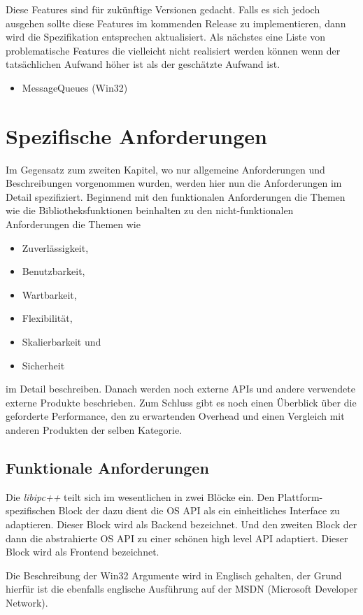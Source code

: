 \documentclass[a4paper]{book}
\begin{document}
Diese Features sind für zukünftige Versionen gedacht. Falls es sich jedoch ausgehen sollte diese Features im kommenden Release zu implementieren, dann wird die Spezifikation entsprechen aktualisiert. Als nächstes eine Liste von problematische Features die vielleicht nicht realisiert werden können wenn der tatsächlichen Aufwand höher ist als der geschätzte Aufwand ist.
\begin{itemize}
\item MessageQueues (Win32)
\end{itemize}

\chapter{Spezifische Anforderungen}
Im Gegensatz zum zweiten Kapitel, wo nur allgemeine Anforderungen und Beschreibungen vorgenommen wurden, werden hier nun die Anforderungen im Detail spezifiziert. Beginnend mit den funktionalen Anforderungen die Themen wie die Bibliotheksfunktionen beinhalten zu den nicht-funktionalen Anforderungen die Themen wie
\begin{itemize}
\item Zuverlässigkeit,
\item Benutzbarkeit,
\item Wartbarkeit,
\item Flexibilität,
\item Skalierbarkeit und
\item Sicherheit
\end{itemize}
im Detail beschreiben. Danach werden noch externe APIs und andere verwendete externe Produkte beschrieben. Zum Schluss gibt es noch einen Überblick über die geforderte Performance, den zu erwartenden Overhead und einen Vergleich mit anderen Produkten der selben Kategorie.

\section{Funktionale Anforderungen}
Die \textit{libipc++} teilt sich im wesentlichen in zwei Blöcke ein. Den Plattform-spezifischen Block der dazu dient die OS API als ein einheitliches Interface zu adaptieren. Dieser Block wird als Backend bezeichnet. Und den zweiten Block der dann die abstrahierte OS API zu einer schönen high level API adaptiert. Dieser Block wird als Frontend bezeichnet.\newline

\noindent Die Beschreibung der Win32 Argumente wird in Englisch gehalten, der Grund hierfür ist die ebenfalls englische Ausführung auf der MSDN (Microsoft Developer Network).
\end{document}
